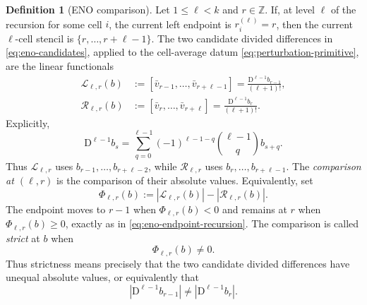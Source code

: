 \documentclass[11pt]{amsart}
\theoremstyle{plain}
\theoremstyle{definition}
\newtheorem{definition}[theorem]{Definition}
\theoremstyle{remark}
\numberwithin{equation}{section}
\theoremstyle{plain}
\begin{document}
\begin{definition}[ENO comparison]
	\label{def:eno-comparison}
	Let $1\le \ell<k$ and $r\in\mathbb Z$.  If, at level $\ell$ of the
	recursion for some cell $i$, the current left endpoint is
	$r_i^{(\ell)}=r$, then the current $\ell$-cell stencil is
	$\{r,\ldots,r+\ell-1\}$.  The two candidate divided differences in
	\eqref{eq:eno-candidates}, applied to the cell-average datum
	\eqref{eq:perturbation-primitive}, are the linear functionals
	\begin{equation}\label{eq:eno-comparison-functionals}
		\begin{aligned}
			\mathcal L_{\ell,r}(b)
			&:=[\bar v_{r-1},\ldots,\bar v_{r+\ell-1}]
			=\frac{\mathrm D^{\ell-1}b_{r-1}}{(\ell+1)!},\\
			\mathcal R_{\ell,r}(b)
			&:=[\bar v_r,\ldots,\bar v_{r+\ell}]
			=\frac{\mathrm D^{\ell-1}b_r}{(\ell+1)!}.
		\end{aligned}
	\end{equation}
	Explicitly,
	\begin{equation}\label{eq:forward-difference-expansion-comparison}
		\mathrm D^{\ell-1}b_s
		=\sum_{q=0}^{\ell-1}(-1)^{\ell-1-q}
		\binom{\ell-1}{q}b_{s+q}.
	\end{equation}
	Thus $\mathcal L_{\ell,r}$ uses
	$b_{r-1},\ldots,b_{r+\ell-2}$, while
	$\mathcal R_{\ell,r}$ uses $b_r,\ldots,b_{r+\ell-1}$.
	The \emph{comparison at $(\ell,r)$} is the comparison of their absolute
	values.  Equivalently, set
	\begin{equation}\label{eq:eno-comparison-value}
		\Phi_{\ell,r}(b)
		:=|\mathcal L_{\ell,r}(b)|-|\mathcal R_{\ell,r}(b)|.
	\end{equation}
	The endpoint moves to $r-1$ when $\Phi_{\ell,r}(b)<0$ and remains at $r$
	when $\Phi_{\ell,r}(b)\ge0$, exactly as in
	\eqref{eq:eno-endpoint-recursion}.  The comparison is called \emph{strict}
	at $b$ when
	\begin{equation}\label{eq:strict-comparison-definition}
		\Phi_{\ell,r}(b)\ne0.
	\end{equation}
	Thus strictness means precisely that the two candidate divided differences
	have unequal absolute values, or equivalently that
	\begin{equation}\label{eq:strict-comparison-finite-differences}
		|\mathrm D^{\ell-1}b_{r-1}|
		\ne |\mathrm D^{\ell-1}b_r|.
	\end{equation}
\end{definition}
\end{document}
